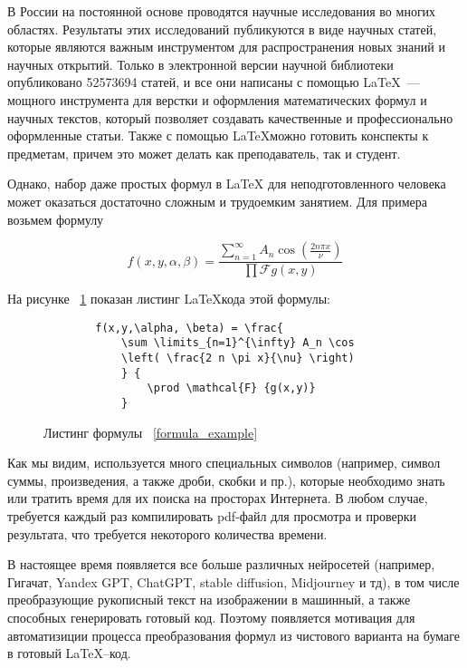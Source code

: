 \introduction %

В России на постоянной основе проводятся научные исследования во многих областях. Результаты этих исследований публикуются в виде научных статей, которые являются важным инструментом для распространения новых знаний и научных открытий.
Только в электронной версии научной библиотеки опубликовано 52573694 \cite{eLib} статей, и все они написаны с помощью \LaTeX ~--- мощного инструмента для верстки и оформления математических формул и научных текстов, который позволяет создавать качественные и профессионально оформленные статьи. 
Также с помощью \LaTeX \quad можно готовить конспекты к предметам, причем это может делать как преподаватель, так и студент.

Однако, набор даже простых формул в LaTeX для неподготовленного человека может оказаться достаточно сложным и трудоемким занятием.
Для примера возьмем формулу

\begin{equation}
    \label{formula_example}
        f(x,y,\alpha, \beta) = \frac{\sum \limits_{n=1}^{\infty} 
        A_n \cos \left( \frac{2 n \pi x}{\nu} \right)} {\prod \mathcal{F} {g(x,y)} } 
\end{equation}

На рисунке ~\ref{formula_listing} показан листинг \LaTeX \quad кода этой формулы:

\begin{figure}
    \begin{lstlisting}
        f(x,y,\alpha, \beta) = \frac{
            \sum \limits_{n=1}^{\infty} A_n \cos 
            \left( \frac{2 n \pi x}{\nu} \right)
            } {
                \prod \mathcal{F} {g(x,y)} 
            } 
    \end{lstlisting}
    \caption{Листинг формулы ~\ref{formula_example}}
    \label{formula_listing}
\end{figure}

Как мы видим, используется много специальных символов (например, символ суммы, произведения, а также дроби, скобки и пр.), которые необходимо знать или тратить время для их поиска на просторах Интернета. 
В любом случае, требуется каждый раз компилировать pdf-файл для просмотра и проверки результата, что требуется некоторого количества времени.

В настоящее время появляется все больше различных нейросетей (например, Гигачат, Yandex GPT, ChatGPT, stable diffusion, Midjourney и тд), в том числе преобразующие рукописный текст на изображении в машинный, а также способных генерировать готовый код. 
Поэтому появляется мотивация для автоматизиции процесса преобразования формул из чистового варианта на бумаге в готовый  \LaTeX --код.

